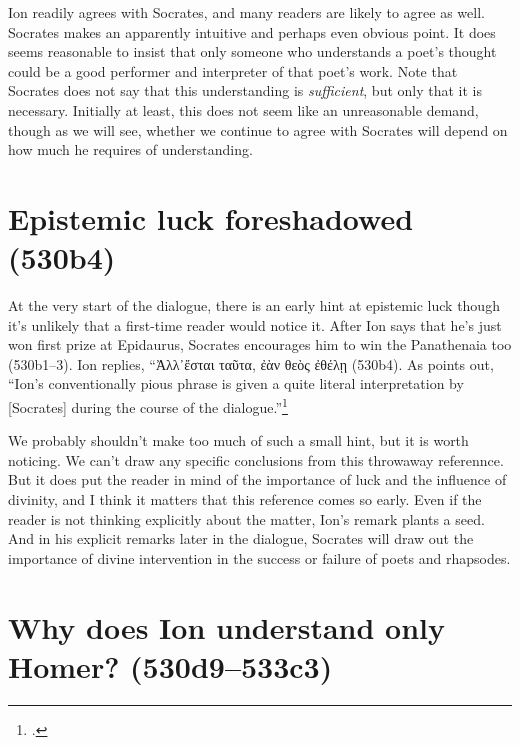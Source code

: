 \documentclass[11pt,letterpaper]{article}
\begin{document}
Ion readily agrees with Socrates, and many readers are likely to agree as well. Socrates makes an apparently intuitive and perhaps even obvious point. It does seems reasonable to insist that only someone who understands a poet's thought could be a good performer and interpreter of that poet's work. Note that Socrates does not say that this understanding is \emph{sufficient}, but only that it is necessary. Initially at least, this does not seem like an unreasonable demand, though as we will see, whether we continue to agree with Socrates will depend on how much he requires of understanding.

\section{Epistemic luck foreshadowed (530b4)}

At the very start of the dialogue, there is an early hint at epistemic luck though it's unlikely that a first-time reader would notice it. After Ion says that he's just won first prize at Epidaurus, Socrates encourages him to win the Panathenaia too (530b1--3). Ion replies, ``\textgreek{Ἀλλ᾽ἔσται ταῦτα, ἐὰν θεὸς ἐθέλῃ} (530b4). As \textcite[101]{murray1996} points out, ``Ion's conventionally pious phrase is given a quite literal interpretation by [Socrates] during the course of the dialogue.''\footcite[Monique Canto notes three other uses of this phrase in Plato: \textit{Phaedo} 69D and 80D and \textit{Hippias Major} 286C. The use in \textit{Hippias Major} is exactly like this one in \textit{Ion}, including the phrase \textgreek{ἔσται ταῦτα}. However in that case Socrates is the speaker, and he's being somewhat ironic][136]{canto2001}

We probably shouldn't make too much of such a small hint, but it is worth noticing. We can't draw any specific conclusions from this throwaway referennce. But it does put the reader in mind of the importance of luck and the influence of divinity, and I think it matters that this reference comes so early. Even if the reader is not thinking explicitly about the matter, Ion's remark plants a seed. And in his explicit remarks later in the dialogue, Socrates will draw out the importance of divine intervention in the success or failure of poets and rhapsodes.

\section{Why does Ion understand only Homer? (530d9--533c3)}
\end{document}
